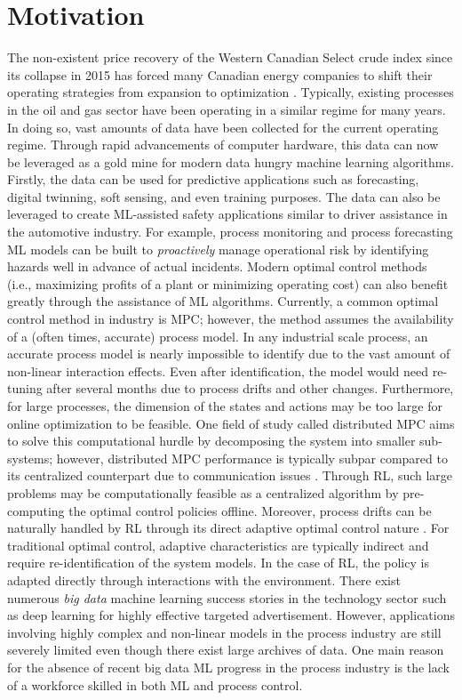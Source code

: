 \section{Motivation}
The non-existent price recovery of the Western Canadian Select crude index since its collapse in 2015 has forced many Canadian energy companies to shift their operating strategies from expansion to optimization \cite{oil_price}.  Typically, existing processes in the oil and gas sector have been operating in a similar regime for many years.  In doing so, vast amounts of data have been collected for the current operating regime.  Through rapid advancements of computer hardware, this data can now be leveraged as a gold mine for modern data hungry machine learning algorithms.  Firstly, the data can be used for predictive applications such as forecasting, digital twinning, soft sensing, and even training purposes.  The data can also be leveraged to create ML-assisted safety applications similar to driver assistance in the automotive industry. For example, process monitoring and process forecasting ML models can be built to \textit{proactively} manage operational risk by identifying hazards well in advance of actual incidents. Modern optimal control methods (i.e., maximizing profits of a plant or minimizing operating cost) can also benefit greatly through the assistance of ML algorithms.  Currently, a common optimal control method in industry is MPC; however, the method assumes the availability of a (often times, accurate) process model.  In any industrial scale process, an accurate process model is nearly impossible to identify due to the vast amount of non-linear interaction effects.  Even after identification, the model would need re-tuning after several months due to process drifts and other changes. Furthermore, for large processes, the dimension of the states and actions may be too large for online optimization to be feasible. One field of study called distributed MPC aims to solve this computational hurdle by decomposing the system into smaller sub-systems; however, distributed MPC performance is typically subpar compared to its centralized counterpart due to communication issues \cite{distributed_mpc}. Through RL, such large problems may be computationally feasible as a centralized algorithm by pre-computing the optimal control policies offline. Moreover, process drifts can be naturally handled by RL through its direct adaptive optimal control nature \cite{direct_adaptive}.  For traditional optimal control, adaptive characteristics are typically indirect and require re-identification of the system models.  In the case of RL, the policy is adapted directly through interactions with the environment. There exist numerous \textit{big data} machine learning success stories in the technology sector such as deep learning for highly effective targeted advertisement. However, applications involving highly complex and non-linear models in the process industry are still severely limited even though there exist large archives of data. One main reason for the absence of recent big data ML progress in the process industry is the lack of a workforce skilled in both ML and process control.

